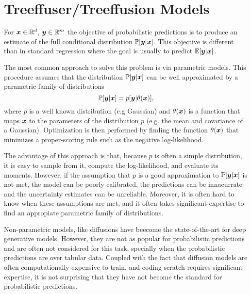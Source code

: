 \section{Treeffuser/Treeffusion Models}
\label{sec:treefusser}
For $\boldsymbol{x} \in \mathbb{R}^d$, $\boldsymbol{y} \in \mathbb{R}^m$ the objective of probabilistic
predictions is to produce an estimate of the full  conditional distribution $\mathbb{P}[\boldsymbol{y}|\boldsymbol{x}]$.
This objective is different than in standard regression where the goal
is usually to predict $\mathbb{E}[\boldsymbol{y}|\boldsymbol{x}]$.

The most common approach to solve this problem is via parametric models.
This procedure assumes that the distribution $\mathbb{P}[\boldsymbol{y}| \boldsymbol{x}]$
can be well approximated by a parametric family of distributions
\[ \mathbb{P}[\boldsymbol{y}| \boldsymbol{x}] = p[\boldsymbol{y}| \theta{(\boldsymbol{x})}], \]
where $p$ is a well known distribution (e.g Gaussian) and $\theta(\boldsymbol{x})$ is a function
that maps $\boldsymbol{x}$ to the parameters of the distribution $p$ (e.g. the mean and covariance of a Gaussian).
Optimization is then performed by finding the function $\theta(\boldsymbol{x})$ that minimizes
a proper-scoring rule such as the negative log-likelihood.

The advantage of this approach is that, because $p$ is often a simple distribution, it is easy
to sample from it, compute the log-likelihood, and evaluate its moments.
However, if the assumption that $p$ is a good approximation to $\mathbb{P}[\boldsymbol{y}| \boldsymbol{x}]$ is not met,
the model can be poorly calibrated, the predictions can be innacurrate and the
uncertainty estimates can be unreliable.
Moreover, it is often hard to know when these assumptions are met, and it often takes significant
expertise to find an appropiate parametric family of distributions.

Non-parametric models, like diffusions have beecome the state-of-the-art for deep generative models.
However, they are not as popular for probabilistic predictions and are often not
considered for this task, specially when the probabilistic predictions are over tabular
data.
Coupled with the fact that diffusion models are often computationally expensive to train,
and coding scratch requires significant expertise, it is not surprising that they have not
become the standard for probabilistic predictions.

